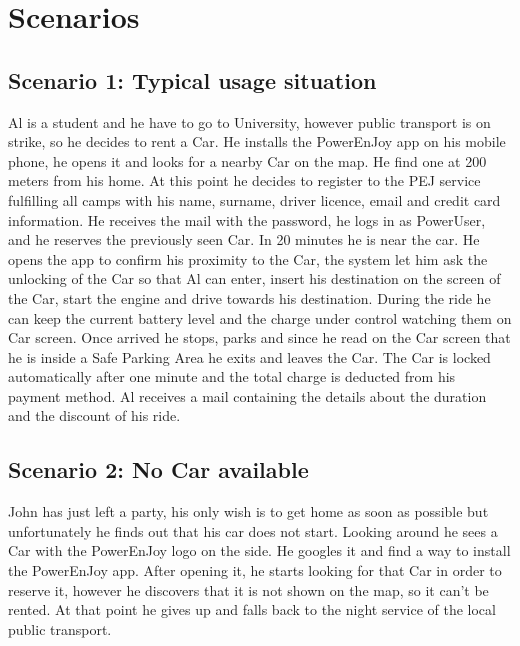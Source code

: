 \section{Scenarios}

\subsection{Scenario 1: Typical usage situation}
Al is a student and he have to go to University, however public transport is on strike, so he decides to rent a Car.  He installs the PowerEnJoy app on his mobile phone, he opens it and looks for a nearby Car on the map. He find one at 200 meters from his home. At this point he decides to register to the PEJ service fulfilling all camps with his name, surname, driver licence, email and credit card information. He receives the mail with the password, he logs in as PowerUser, and he reserves the previously seen Car. In 20 minutes he is near the car. He opens the app to confirm his proximity to the Car, the system let him ask the unlocking of the Car so that Al can enter, insert his destination on the screen of the Car, start the engine and drive towards his destination. During the ride he can keep the current battery level and the charge under control watching them on Car screen. Once arrived he stops, parks and since he read on the Car screen that he is inside a Safe Parking Area he exits and leaves the Car. The Car is locked automatically after one minute and the total charge is deducted from his payment method. Al receives a mail containing the details about the duration and the discount of his ride.

\subsection{Scenario 2: No Car available}
John has just left a party, his only wish is to get home as soon as possible but unfortunately he finds out that his car does not start. Looking around he sees a Car with the PowerEnJoy logo on the side. He googles it and find a way to install the PowerEnJoy app. After opening it, he starts looking for that Car in order to reserve it, however he discovers that it is not shown on the map, so it can't be rented. At that point he gives up and falls back to the night service of the local public transport.

